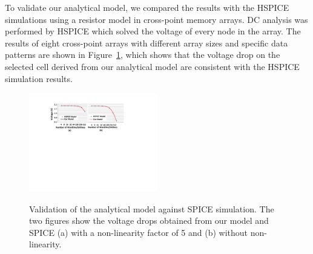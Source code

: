 To validate our analytical model, we compared the results with the HSPICE
simulations using a resistor model in cross-point memory arrays. DC
analysis was performed by HSPICE which solved the voltage of every node in
the array. The results of eight cross-point arrays with different array
sizes and specific data patterns are shown in Figure~\ref{fig:validation}, 
which shows that the voltage drop on the selected cell derived from our analytical 
model are consistent with the HSPICE simulation results.
\begin{figure}%
\centering\label{fig:SPICE}
  \includegraphics[width=0.5\textwidth]{./figures/SPICE.pdf}\\
  \caption{Validation of the analytical model against SPICE simulation. The two figures show the voltage drops obtained from our model and SPICE (a) with a non-linearity factor of 5 and (b) without non-linearity.}\label{fig:validation}
    \vspace{-10pt}
\end{figure}
%
